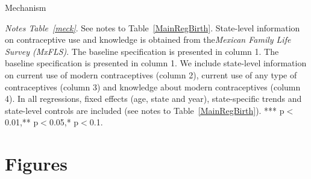 \documentclass[a4paper, 11pt]{article}
\begin{document}
\begin{spacing}{2}
\begin{table}[H]\centering\caption{Mechanism}\label{meck}
\begin{threeparttable}\centering
\begin{subtable}{\textwidth}\centering{}\label{meckFertility}
{\footnotesize }
\end{subtable}
\begin{subtable}{\textwidth}\centering{}\label{meckMMR}
{\footnotesize  }
\end{subtable}
\begin{tablenotes}
\footnotesize
\item \textit{Notes Table~\ref*{meck}}. See notes to Table~\ref{MainRegBirth}. State-level information on contraceptive use and knowledge is obtained from the\textit{Mexican Family Life Survey (MxFLS)}. The baseline specification is presented in column 1. The baseline specification is presented in column 1. We include state-level information on current use of modern contraceptives (column 2), current use of any type of contraceptives (column 3) and knowledge about modern contraceptives (column 4). In all regressions, fixed effects (age, state and year), state-specific trends and state-level controls are included (see notes to Table~\ref{MainRegBirth}). *** p$<$0.01,** p$<$0.05,* p$<$0.1.
\end{tablenotes}
\end{threeparttable}
\end{table}
\restoregeometry


\clearpage
\section*{Figures}


\end{spacing}
\end{document}
